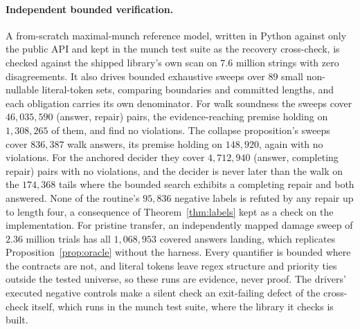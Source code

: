 \documentclass[11pt,a4paper]{article}
\theoremstyle{definition}
\theoremstyle{plain}
\theoremstyle{remark}
\begin{document}
\paragraph{Independent bounded verification.} A from-scratch maximal-munch reference model, written in Python against
only the public API and kept in the munch test suite as the recovery cross-check, is checked against the shipped
library's own scan on $7.6$ million strings with zero disagreements. It also drives bounded exhaustive sweeps over $89$
small non-nullable literal-token sets, comparing boundaries and committed lengths, and each obligation carries its own
denominator. For walk soundness the sweeps cover $46{,}035{,}590$ (answer, repair) pairs, the evidence-reaching premise
holding on $1{,}308{,}265$ of them, and find no violations. The collapse proposition's sweeps cover $836{,}387$ walk
answers, its premise holding on $148{,}920$, again with no violations. For the anchored decider they cover
$4{,}712{,}940$ (answer, completing repair) pairs with no violations, and the decider is never later than the walk on
the $174{,}368$ tails where the bounded search exhibits a completing repair and both answered. None of the routine's
$95{,}836$ negative labels is refuted by any repair up to length four, a consequence of Theorem~\ref{thm:labels} kept as
a check on the implementation. For pristine transfer, an independently mapped damage sweep of $2.36$ million trials has
all $1{,}068{,}953$ covered answers landing, which replicates Proposition~\ref{prop:oracle} without the harness. Every
quantifier is bounded where the contracts are not, and literal tokens leave regex structure and priority ties outside
the tested universe, so these runs are evidence, never proof. The drivers' executed negative controls make a silent
check an exit-failing defect of the cross-check itself, which runs in the munch test suite, where the library it checks
is built.
\end{document}
